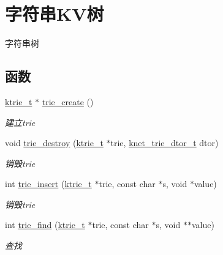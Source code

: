 \hypertarget{a00144}{}\section{字符串\+K\+V树}
\label{a00144}


字符串树  


\subsection*{函数}
\begin{DoxyCompactItemize}
\item 
\hyperlink{a00066_a6b38314f31c4ed3eb36896383425a381_a6b38314f31c4ed3eb36896383425a381}{ktrie\+\_\+t} $\ast$ \hyperlink{a00144_ga40c34f3f3eed953a77e3df2927a24d0c_ga40c34f3f3eed953a77e3df2927a24d0c}{trie\+\_\+create} ()
\begin{DoxyCompactList}\small\item\em 建立trie \end{DoxyCompactList}\item 
void \hyperlink{a00144_ga1d3fcf14bbc77f4b3221ddb1121c21a0_ga1d3fcf14bbc77f4b3221ddb1121c21a0}{trie\+\_\+destroy} (\hyperlink{a00066_a6b38314f31c4ed3eb36896383425a381_a6b38314f31c4ed3eb36896383425a381}{ktrie\+\_\+t} $\ast$trie, \hyperlink{a00066_a46741b0dab7bbb26d611c429ee64d78c_a46741b0dab7bbb26d611c429ee64d78c}{knet\+\_\+trie\+\_\+dtor\+\_\+t} dtor)
\begin{DoxyCompactList}\small\item\em 销毁trie \end{DoxyCompactList}\item 
int \hyperlink{a00144_ga05e43d257d3626377de3340b6cd542fa_ga05e43d257d3626377de3340b6cd542fa}{trie\+\_\+insert} (\hyperlink{a00066_a6b38314f31c4ed3eb36896383425a381_a6b38314f31c4ed3eb36896383425a381}{ktrie\+\_\+t} $\ast$trie, const char $\ast$s, void $\ast$value)
\begin{DoxyCompactList}\small\item\em 销毁trie \end{DoxyCompactList}\item 
int \hyperlink{a00144_gae9c0f01c6b0eaf828710de2999601a11_gae9c0f01c6b0eaf828710de2999601a11}{trie\+\_\+find} (\hyperlink{a00066_a6b38314f31c4ed3eb36896383425a381_a6b38314f31c4ed3eb36896383425a381}{ktrie\+\_\+t} $\ast$trie, const char $\ast$s, void $\ast$$\ast$value)
\begin{DoxyCompactList}\small\item\em 查找 \end{DoxyCompactList}\item 
$$
\end{DoxyCompactItemize}
